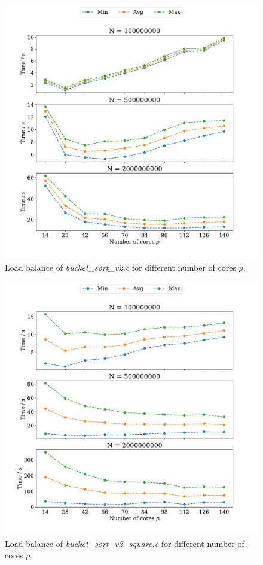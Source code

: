 \documentclass[a4paper, 11pt]{article}
\begin{document}
\begin{figure}
  \centering
  \includegraphics[width=\textwidth]{../part_2/plot/v2_load_balance.pdf}
  \caption{Load balance of \textit{bucket\_sort\_v2.c} for different number of
  cores $p$.}
  \label{fig:p2_v2_load_balance}
\end{figure}
\begin{figure}
  \centering
  \includegraphics[width=\textwidth]{../part_2/plot/v2_square_load_balance.pdf}
  \caption{Load balance of \textit{bucket\_sort\_v2\_square.c} for different
  number of cores $p$.}
  \label{fig:p2_v2_square_load_balance}
\end{figure}
\end{document}
